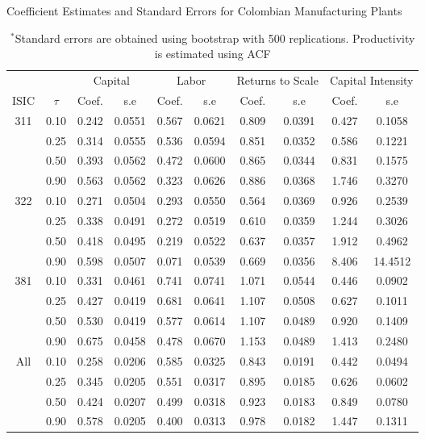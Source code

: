 \documentclass[11pt]{article}
\begin{document}
\begin{table}[H]
\centering
\caption{Coefficient Estimates and Standard Errors for Colombian Manufacturing Plants}
\begin{tabular}{cccccccccc}
  \hline\hline & & \multicolumn{2}{c}{Capital}  & \multicolumn{2}{c}{Labor} & \multicolumn{2}{c}{Returns to Scale} & \multicolumn{2}{c}{Capital Intensity}\\ \cmidrule(lr){3-4} \cmidrule(lr){5-6} \cmidrule(lr){7-8} \cmidrule(lr){9-10}ISIC & $\tau$ & Coef. & s.e & Coef. & s.e & Coef. & s.e & Coef. & s.e \\ 
  \hline
311 & 0.10 & 0.242 & 0.0551 & 0.567 & 0.0621 & 0.809 & 0.0391 & 0.427 & 0.1058 \\ 
   & 0.25 & 0.314 & 0.0555 & 0.536 & 0.0594 & 0.851 & 0.0352 & 0.586 & 0.1221 \\ 
   & 0.50 & 0.393 & 0.0562 & 0.472 & 0.0600 & 0.865 & 0.0344 & 0.831 & 0.1575 \\ 
   & 0.90 & 0.563 & 0.0562 & 0.323 & 0.0626 & 0.886 & 0.0368 & 1.746 & 0.3270 \\ 
  322 & 0.10 & 0.271 & 0.0504 & 0.293 & 0.0550 & 0.564 & 0.0369 & 0.926 & 0.2539 \\ 
   & 0.25 & 0.338 & 0.0491 & 0.272 & 0.0519 & 0.610 & 0.0359 & 1.244 & 0.3026 \\ 
   & 0.50 & 0.418 & 0.0495 & 0.219 & 0.0522 & 0.637 & 0.0357 & 1.912 & 0.4962 \\ 
   & 0.90 & 0.598 & 0.0507 & 0.071 & 0.0539 & 0.669 & 0.0356 & 8.406 & 14.4512 \\ 
  381 & 0.10 & 0.331 & 0.0461 & 0.741 & 0.0741 & 1.071 & 0.0544 & 0.446 & 0.0902 \\ 
   & 0.25 & 0.427 & 0.0419 & 0.681 & 0.0641 & 1.107 & 0.0508 & 0.627 & 0.1011 \\ 
   & 0.50 & 0.530 & 0.0419 & 0.577 & 0.0614 & 1.107 & 0.0489 & 0.920 & 0.1409 \\ 
   & 0.90 & 0.675 & 0.0458 & 0.478 & 0.0670 & 1.153 & 0.0489 & 1.413 & 0.2480 \\ 
  All & 0.10 & 0.258 & 0.0206 & 0.585 & 0.0325 & 0.843 & 0.0191 & 0.442 & 0.0494 \\ 
   & 0.25 & 0.345 & 0.0205 & 0.551 & 0.0317 & 0.895 & 0.0185 & 0.626 & 0.0602 \\ 
   & 0.50 & 0.424 & 0.0207 & 0.499 & 0.0318 & 0.923 & 0.0183 & 0.849 & 0.0780 \\ 
   & 0.90 & 0.578 & 0.0205 & 0.400 & 0.0313 & 0.978 & 0.0182 & 1.447 & 0.1311 \\ 
   \hline
\end{tabular}
\caption*{\footnotesize $^{*}$Standard errors are obtained using bootstrap with 500 replications. Productivity is estimated using ACF}
\label{COLestACF}
\end{table}
\end{document}
